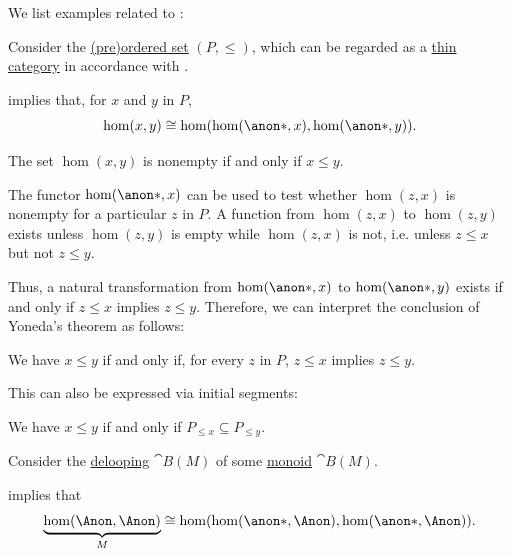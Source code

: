 \begin{example}\label{ex:thm:yonedas_embedding_theorem}
  We list examples related to :
  \begin{thmenum}
     Consider the \hyperref[def:preordered_set]{(pre)ordered set} \( (P, \leq) \), which can be regarded as a \hyperref[def:thin_category]{thin category} in accordance with .

     implies that, for \( x \) and \( y \) in \( P \),
    \begin{equation*}
      \hom(x, y) \cong \hom(\hom(\anon*, x), \hom(\anon*, y)).
    \end{equation*}

    The set \( \hom(x, y) \) is nonempty if and only if \( x \leq y \).

    The functor \( \hom(\anon*, x) \) can be used to test whether \( \hom(z, x) \) is nonempty for a particular \( z \) in \( P \). A function from \( \hom(z, x) \) to \( \hom(z, y) \) exists unless \( \hom(z, y) \) is empty while \( \hom(z, x) \) is not, i.e. unless \( z \leq x \) but not \( z \leq y \).

    Thus, a natural transformation from \( \hom(\anon*, x) \) to \( \hom(\anon*, y) \) exists if and only if \( z \leq x \) implies \( z \leq y \). Therefore, we can interpret the conclusion of Yoneda's theorem as follows:
    \begin{center}
      We have \( x \leq y \) if and only if, for every \( z \) in \( P \), \( z \leq x \) implies \( z \leq y \).
    \end{center}

    This can also be expressed via initial segments:
    \begin{center}
      We have \( x \leq y \) if and only if \( P_{\leq x} \subseteq P_{\leq y} \).
    \end{center}

     Consider the \hyperref[def:monoid_delooping]{delooping} \( \cat{B}(M) \) of some \hyperref[def:monoid]{monoid} \( \cat{B}(M) \).

     implies that
    \begin{equation*}
      \underbrace{\hom(\Anon, \Anon)}_M \cong \hom(\hom(\anon*, \Anon), \hom(\anon*, \Anon)).
    \end{equation*}


\end{thmenum}
\end{example}
